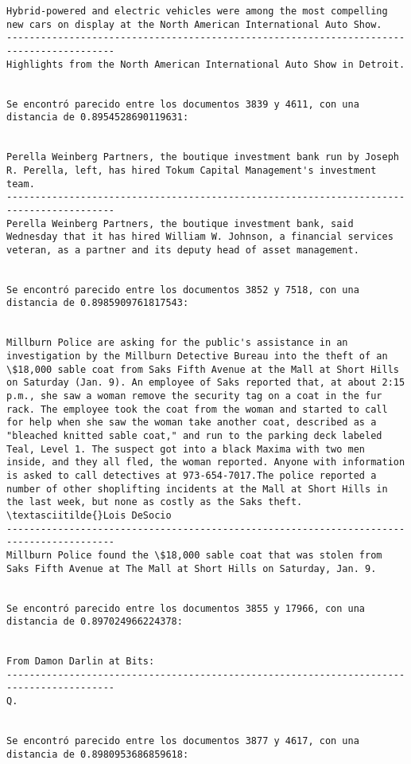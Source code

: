 \documentclass[11pt]{article}
\begin{document}
\begin{Verbatim}[commandchars=\\\{\}]
Hybrid-powered and electric vehicles were among the most compelling new cars on display at the North American International Auto Show.
-----------------------------------------------------------------------------------------
Highlights from the North American International Auto Show in Detroit.


Se encontró parecido entre los documentos 3839 y 4611, con una distancia de 0.8954528690119631:


Perella Weinberg Partners, the boutique investment bank run by Joseph R. Perella, left, has hired Tokum Capital Management's investment team.
-----------------------------------------------------------------------------------------
Perella Weinberg Partners, the boutique investment bank, said Wednesday that it has hired William W. Johnson, a financial services veteran, as a partner and its deputy head of asset management.


Se encontró parecido entre los documentos 3852 y 7518, con una distancia de 0.8985909761817543:


Millburn Police are asking for the public's assistance in an investigation by the Millburn Detective Bureau into the theft of an \$18,000 sable coat from Saks Fifth Avenue at the Mall at Short Hills on Saturday (Jan. 9). An employee of Saks reported that, at about 2:15 p.m., she saw a woman remove the security tag on a coat in the fur rack. The employee took the coat from the woman and started to call for help when she saw the woman take another coat, described as a "bleached knitted sable coat," and run to the parking deck labeled Teal, Level 1. The suspect got into a black Maxima with two men inside, and they all fled, the woman reported. Anyone with information is asked to call detectives at 973-654-7017.The police reported a number of other shoplifting incidents at the Mall at Short Hills in the last week, but none as costly as the Saks theft. \textasciitilde{}Lois DeSocio
-----------------------------------------------------------------------------------------
Millburn Police found the \$18,000 sable coat that was stolen from Saks Fifth Avenue at The Mall at Short Hills on Saturday, Jan. 9.


Se encontró parecido entre los documentos 3855 y 17966, con una distancia de 0.897024966224378:


From Damon Darlin at Bits:
-----------------------------------------------------------------------------------------
Q.


Se encontró parecido entre los documentos 3877 y 4617, con una distancia de 0.8980953686859618:



\end{Verbatim}
\end{document}
